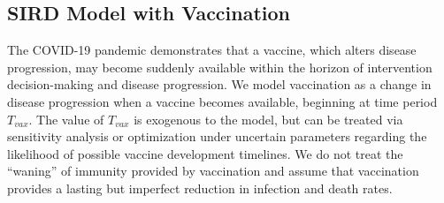 \documentclass{article}
\begin{document}
\subsection{SIRD Model with Vaccination}

The COVID-19 pandemic demonstrates that a vaccine, which alters disease progression, may become suddenly available within the horizon of intervention decision-making and disease progression. We model vaccination as a change in disease progression when a vaccine becomes available, beginning at time period $T_{vax}$. The value of $T_{vax}$ is exogenous to the model, but can be treated via sensitivity analysis or optimization under uncertain parameters regarding the likelihood of possible vaccine development timelines. We do not treat the ``waning'' of immunity provided by vaccination and assume that vaccination provides a lasting but imperfect reduction in infection and death rates.
\end{document}
